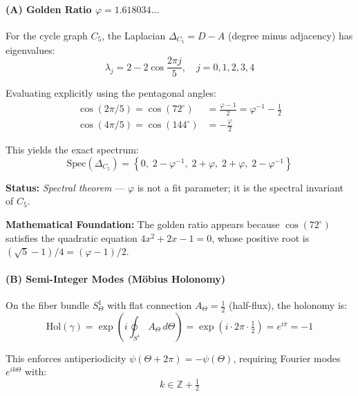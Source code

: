 \documentclass[12pt]{article}
\begin{document}
\paragraph{(A) Golden Ratio $\varphi = 1.618034\ldots$}

For the cycle graph $C_5$, the Laplacian $\Delta_{C_5} = D - A$ (degree minus adjacency) has eigenvalues:
\begin{equation}
\lambda_j = 2 - 2\cos\!\frac{2\pi j}{5}, \quad j = 0, 1, 2, 3, 4
\end{equation}

Evaluating explicitly using the pentagonal angles:
\begin{align}
\cos(2\pi/5) = \cos(72^\circ) &= \frac{\varphi - 1}{2} = \varphi^{-1} - \frac{1}{2} \\
\cos(4\pi/5) = \cos(144^\circ) &= -\frac{\varphi}{2}
\end{align}

This yields the exact spectrum:
\begin{equation}
\boxed{\text{Spec}(\Delta_{C_5}) = \left\{0,\; 2 - \varphi^{-1},\; 2 + \varphi,\; 2 + \varphi,\; 2 - \varphi^{-1}\right\}}
\end{equation}

\textbf{Status:} \textit{Spectral theorem} — $\varphi$ is not a fit parameter; it is the spectral invariant of $C_5$.

\textbf{Mathematical Foundation:} The golden ratio appears because $\cos(72^\circ)$ satisfies the quadratic equation $4x^2 + 2x - 1 = 0$, whose positive root is $(\sqrt{5} - 1)/4 = (\varphi - 1)/2$.

\paragraph{(B) Semi-Integer Modes (M\"obius Holonomy)}

On the fiber bundle $S^1_\Theta$ with flat connection $A_\Theta = \tfrac{1}{2}$ (half-flux), the holonomy is:
\begin{equation}
\text{Hol}(\gamma) = \exp\!\left(i \oint_{S^1} A_\Theta \, d\Theta\right) = \exp(i \cdot 2\pi \cdot \tfrac{1}{2}) = e^{i\pi} = -1
\end{equation}

This enforces antiperiodicity $\psi(\Theta + 2\pi) = -\psi(\Theta)$, requiring Fourier modes $e^{ik\Theta}$ with:
\begin{equation}
\boxed{k \in \mathbb{Z} + \tfrac{1}{2}}
\end{equation}
\end{document}

